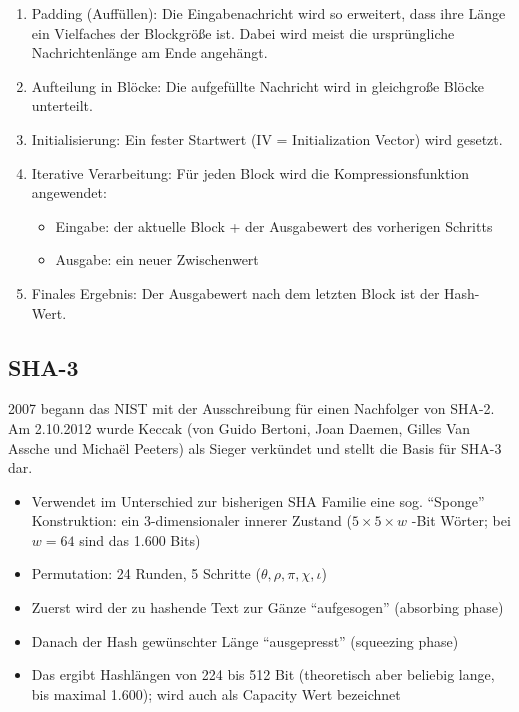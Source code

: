 \begin{enumerate}
    \item Padding (Auffüllen): Die Eingabenachricht wird so erweitert, dass ihre Länge ein Vielfaches der Blockgröße ist. Dabei wird meist die ursprüngliche 
    Nachrichtenlänge am Ende angehängt.
    \item Aufteilung in Blöcke: Die aufgefüllte Nachricht wird in gleichgroße Blöcke unterteilt.
    \item Initialisierung: Ein fester Startwert (IV = Initialization Vector) wird gesetzt.
    \item Iterative Verarbeitung: Für jeden Block wird die Kompressionsfunktion angewendet:
    \begin{itemize}
        \item Eingabe: der aktuelle Block + der Ausgabewert des vorherigen Schritts
        \item Ausgabe: ein neuer Zwischenwert
    \end{itemize}
    \item Finales Ergebnis: Der Ausgabewert nach dem letzten Block ist der Hash-Wert.
\end{enumerate}

\subsection{SHA-3}

2007 begann das NIST mit der Ausschreibung für einen Nachfolger von SHA-2. Am 2.10.2012 wurde Keccak (von Guido
Bertoni, Joan Daemen, Gilles Van Assche und Michaël Peeters) als Sieger verkündet und stellt die Basis für SHA-3 dar.

\begin{itemize}
    \item Verwendet im Unterschied zur bisherigen SHA Familie eine sog. ``Sponge'' Konstruktion: ein 3-dimensionaler innerer Zustand ($5\times 5\times w$ -Bit Wörter; 
    bei $w =64$ sind das 1.600 Bits)
    \item Permutation: 24 Runden, 5 Schritte ($\theta, \rho, \pi, \chi, \iota$)
    \item Zuerst wird der zu hashende Text zur Gänze ``aufgesogen'' (absorbing phase)
    \item Danach der Hash gewünschter Länge ``ausgepresst'' (squeezing phase)
    \item Das ergibt Hashlängen von 224 bis 512 Bit (theoretisch aber beliebig lange, bis maximal 1.600); wird auch als Capacity Wert bezeichnet
\end{itemize}


